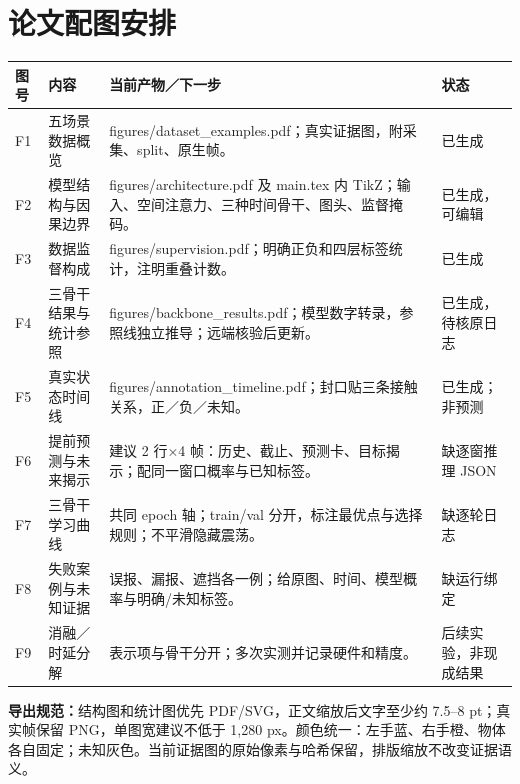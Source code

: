 \documentclass[11pt,a4paper]{ctexart}
\begin{document}
\section{论文配图安排}
\begin{longtable}{L{.8cm}L{3.5cm}L{6.7cm}L{3cm}}
\toprule 图号 & 内容 & 当前产物／下一步 & 状态\\\midrule\endhead
F1 & 五场景数据概览 & figures/dataset\_examples.pdf；真实证据图，附采集、split、原生帧。& 已生成\\
F2 & 模型结构与因果边界 & figures/architecture.pdf 及 main.tex 内 TikZ；输入、空间注意力、三种时间骨干、图头、监督掩码。& 已生成，可编辑\\
F3 & 数据监督构成 & figures/supervision.pdf；明确正负和四层标签统计，注明重叠计数。& 已生成\\
F4 & 三骨干结果与统计参照 & figures/backbone\_results.pdf；模型数字转录，参照线独立推导；远端核验后更新。& 已生成，待核原日志\\
F5 & 真实状态时间线 & figures/annotation\_timeline.pdf；封口贴三条接触关系，正／负／未知。& 已生成；非预测\\
F6 & 提前预测与未来揭示 & 建议 2 行×4 帧：历史、截止、预测卡、目标揭示；配同一窗口概率与已知标签。& 缺逐窗推理 JSON\\
F7 & 三骨干学习曲线 & 共同 epoch 轴；train/val 分开，标注最优点与选择规则；不平滑隐藏震荡。& 缺逐轮日志\\
F8 & 失败案例与未知证据 & 误报、漏报、遮挡各一例；给原图、时间、模型概率与明确/未知标签。& 缺运行绑定\\
F9 & 消融／时延分解 & 表示项与骨干分开；多次实测并记录硬件和精度。& 后续实验，非现成结果\\
\bottomrule
\end{longtable}
\textbf{导出规范：}结构图和统计图优先 PDF/SVG，正文缩放后文字至少约 7.5--8 pt；真实帧保留 PNG，单图宽建议不低于 1,280 px。颜色统一：左手蓝、右手橙、物体各自固定；未知灰色。当前证据图的原始像素与哈希保留，排版缩放不改变证据语义。
\end{document}
